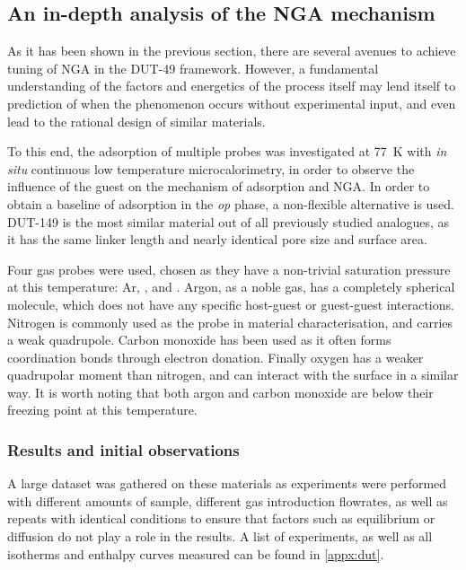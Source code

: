 
\subsection{An in-depth analysis of the NGA mechanism}%
\label{dut:indepth}

As it has been shown in the previous section, there are 
several avenues to achieve tuning of NGA in the DUT-49 framework.
However, a fundamental understanding of the factors and 
energetics of the process itself may
lend itself to prediction of when the phenomenon occurs without 
experimental input, and even lead to the rational design of 
similar materials.

To this end, the adsorption of multiple probes was investigated 
at \SI{77}{\kelvin} with \textit{in situ} continuous low 
temperature microcalorimetry,
in order to observe the influence of the guest on the mechanism of
adsorption and NGA. In order to obtain a baseline of adsorption in 
the \textit{op} phase, a non-flexible alternative is used. 
DUT-149 is the most similar material out of all previously studied
analogues, as it has the same linker length and nearly identical pore
size and surface area. 

Four gas probes were used, chosen as they 
have a non-trivial saturation pressure at this temperature: Ar,
,  and . Argon, as a 
noble gas, has a completely spherical molecule, which does not 
have any specific host-guest or guest-guest interactions. Nitrogen
is commonly used as the probe in material characterisation, 
and carries a weak quadrupole. Carbon monoxide has been used 
as it often forms coordination bonds through electron donation.
Finally oxygen has a weaker quadrupolar moment than 
nitrogen, and can interact with the surface in a similar way.
It is worth noting that both argon and carbon monoxide are below 
their freezing point at this temperature.

\subsubsection{Results and initial observations}

A large dataset was gathered
on these materials as experiments were performed with different 
amounts of sample, different gas introduction flowrates, as well as repeats
with identical conditions to ensure that factors such as 
equilibrium or diffusion do not play a role in the results. A list 
of experiments, as well as all isotherms and enthalpy curves measured can
be found in \autoref{appx:dut}. 


